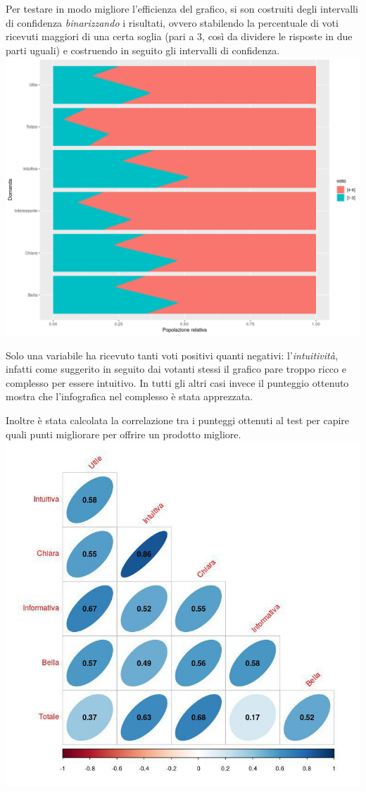 \documentclass[12pt, a4paper, twocolumn]{article} %
\begin{document}
Per testare in modo migliore l'efficienza del grafico, si son costruiti degli intervalli di confidenza \textit{binarizzando} i risultati, ovvero stabilendo la percentuale di voti ricevuti maggiori di una certa soglia (pari a 3, così da dividere le risposte in due parti uguali) e costruendo in seguito gli intervalli di confidenza.
\includegraphics[width=\linewidth]{barplot.png}

Solo una variabile ha ricevuto tanti voti positivi quanti negativi: l'\textit{intuitività}, infatti come suggerito in seguito dai votanti stessi il grafico pare troppo ricco e complesso per essere intuitivo.
In tutti gli altri casi invece il punteggio ottenuto mostra che l'infografica nel complesso è stata apprezzata.

Inoltre è stata calcolata la correlazione tra i punteggi ottenuti al test per capire quali punti migliorare per offrire un prodotto migliore.
\includegraphics[width=\linewidth]{correlogramma.jpg}
\end{document}
